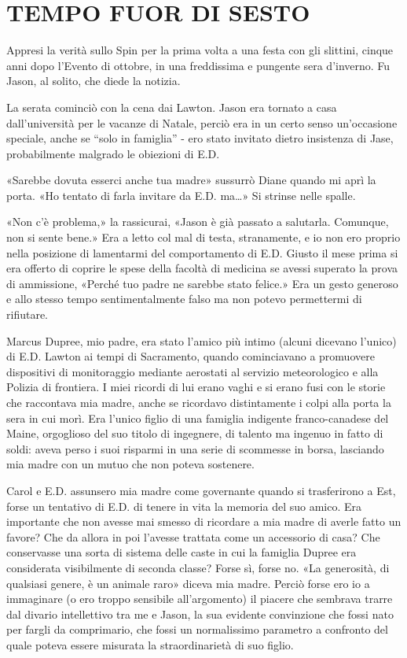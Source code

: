 \chapter{TEMPO FUOR DI SESTO}\label{tempo-fuor-di-sesto}

\hfill\break

Appresi la verità sullo Spin per la prima volta a una festa con gli
slittini, cinque anni dopo l'Evento di ottobre, in una freddissima e
pungente sera d'inverno. Fu Jason, al solito, che diede la notizia.

La serata cominciò con la cena dai Lawton. Jason era tornato a casa
dall'università per le vacanze di Natale, perciò era in un certo senso
un'occasione speciale, anche se ``solo in famiglia'' - ero stato
invitato dietro insistenza di Jase, probabilmente malgrado le obiezioni
di E.D.

«Sarebbe dovuta esserci anche tua madre» sussurrò Diane quando mi aprì
la porta. «Ho tentato di farla invitare da E.D. ma\ldots» Si strinse
nelle spalle.

«Non c'è problema,» la rassicurai, «Jason è già passato a salutarla.
Comunque, non si sente bene.» Era a letto col mal di testa, stranamente,
e io non ero proprio nella posizione di lamentarmi del comportamento di
E.D. Giusto il mese prima si era offerto di coprire le spese della
facoltà di medicina se avessi superato la prova di ammissione, «Perché
tuo padre ne sarebbe stato felice.» Era un gesto generoso e allo stesso
tempo sentimentalmente falso ma non potevo permettermi di rifiutare.

Marcus Dupree, mio padre, era stato l'amico più intimo (alcuni dicevano
l'unico) di E.D. Lawton ai tempi di Sacramento, quando cominciavano a
promuovere dispositivi di monitoraggio mediante aerostati al servizio
meteorologico e alla Polizia di frontiera. I miei ricordi di lui erano
vaghi e si erano fusi con le storie che raccontava mia madre, anche se
ricordavo distintamente i colpi alla porta la sera in cui morì. Era
l'unico figlio di una famiglia indigente franco-canadese del Maine,
orgoglioso del suo titolo di ingegnere, di talento ma ingenuo in fatto
di soldi: aveva perso i suoi risparmi in una serie di scommesse in
borsa, lasciando mia madre con un mutuo che non poteva sostenere.

Carol e E.D. assunsero mia madre come governante quando si trasferirono
a Est, forse un tentativo di E.D. di tenere in vita la memoria del suo
amico. Era importante che non avesse mai smesso di ricordare a mia madre
di averle fatto un favore? Che da allora in poi l'avesse trattata come
un accessorio di casa? Che conservasse una sorta di sistema delle caste
in cui la famiglia Dupree era considerata visibilmente di seconda
classe? Forse sì, forse no. «La generosità, di qualsiasi genere, è un
animale raro» diceva mia madre. Perciò forse ero io a immaginare (o ero
troppo sensibile all'argomento) il piacere che sembrava trarre dal
divario intellettivo tra me e Jason, la sua evidente convinzione che
fossi nato per fargli da comprimario, che fossi un normalissimo
parametro a confronto del quale poteva essere misurata la
straordinarietà di suo figlio.

